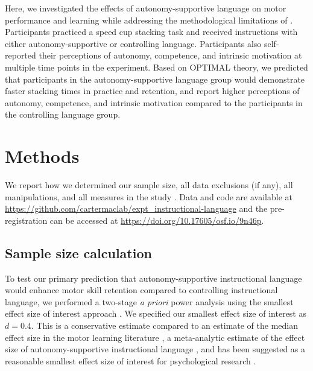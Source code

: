 \documentclass[doc,floatsintext,donotrepeattitle,letterpaper,12pt]{apa7}
\begin{document}
Here, we investigated the effects of autonomy-supportive language on motor performance and learning while addressing the methodological limitations of \textcite{hooyman2014}. Participants practiced a speed cup stacking task and received instructions with either autonomy-supportive or controlling language. Participants also self-reported their perceptions of autonomy, competence, and intrinsic motivation at multiple time points in the experiment. Based on OPTIMAL theory, we predicted that participants in the autonomy-supportive language group would demonstrate faster stacking times in practice and retention, and report higher perceptions of autonomy, competence, and intrinsic motivation compared to the participants in the controlling language group.

\section{Methods}

We report how we determined our sample size, all data exclusions (if any), all manipulations, and all measures in the study \autocite{simmons2012}. Data and code are available at \url{https://github.com/cartermaclab/expt_instructional-language} and the pre-registration can be accessed at \url{https://doi.org/10.17605/osf.io/9n46p}.

\subsection{Sample size calculation}

To test our primary prediction that autonomy-supportive instructional language would enhance motor skill retention compared to controlling instructional language, we performed a two-stage \emph{a priori} power analysis using the smallest effect size of interest approach \autocite[see][for a discussion]{lakens2022}. We specified our smallest effect size of interest as $d = 0.4$. This is a conservative estimate compared to an estimate of the median effect size in the motor learning literature \autocite[$d = 0.63$ in][]{lohse2016}, a meta-analytic estimate of the effect size of autonomy-supportive instructional language \autocite[$d = 0.63$,][]{su2011}, and has been suggested as a reasonable smallest effect size of interest for psychological research \autocite{brysbaert2019}.
\end{document}

